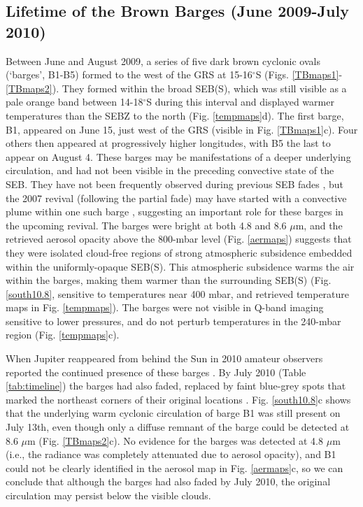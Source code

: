 \documentclass[final,5p,times,twocolumn,authoryear]{elsarticle}
\newcommand{\degree}{\ensuremath{^\circ}}
\begin{document}
\subsection{Lifetime of the Brown Barges (June 2009-July 2010)}



Between June and August 2009, a series of five dark brown cyclonic ovals (`barges', B1-B5) formed to the west of the GRS \citep{10rogers} at 15-16\degree S (Figs. \ref{TBmaps1}-\ref{TBmaps2}).   They formed within the broad SEB(S), which was still visible as a pale orange band between 14-18$^\circ$S during this interval and displayed warmer temperatures than the SEBZ to the north (Fig. \ref{tempmaps}d).  The first barge, B1, appeared on June 15, just west of the GRS (visible in Fig. \ref{TBmaps1}c).  Four others then appeared at progressively higher longitudes, with B5 the last to appear on August 4.  These barges may be manifestations of a deeper underlying circulation, and had not been visible in the preceding convective state of the SEB.  They have not been frequently observed during previous SEB fades \citep[summarised by][]{96sanchez_jup}, but the 2007 revival (following the partial fade) may have started with a convective plume within one such barge \citep{07rogers_climax}, suggesting an important role for these barges in the upcoming revival.  The barges were bright at both 4.8 and 8.6 $\mu$m, and the retrieved aerosol opacity above the 800-mbar level (Fig. \ref{aermaps}) suggests that they were isolated cloud-free regions of strong atmospheric subsidence embedded within the uniformly-opaque SEB(S).  This atmospheric subsidence warms the air within the barges, making them warmer than the surrounding SEB(S) (Fig. \ref{south10.8}, sensitive to temperatures near 400 mbar, and retrieved temperature maps in Fig. \ref{tempmaps}).  The barges were not visible in Q-band imaging sensitive to lower pressures, and do not perturb temperatures in the 240-mbar region (Fig. \ref{tempmaps}c).

When Jupiter reappeared from behind the Sun in 2010 amateur observers reported the continued presence of these barges \citep{10rogers}.  By July 2010 (Table \ref{tab:timeline}) the barges had also faded, replaced by faint blue-grey spots that marked the northeast corners of their original locations \citep{10rogers_spots}.  Fig. \ref{south10.8}c shows that the underlying warm cyclonic circulation of barge B1 was still present on July 13th, even though only a diffuse remnant of the barge could be detected at 8.6 $\mu$m (Fig. \ref{TBmaps2}c).  No evidence for the barges was detected at 4.8 $\mu$m (i.e., the radiance was completely attenuated due to aerosol opacity), and B1 could not be clearly identified in the aerosol map in Fig. \ref{aermaps}c, so we can conclude that although the barges had also faded by July 2010, the original circulation may persist below the visible clouds.  
\end{document}
